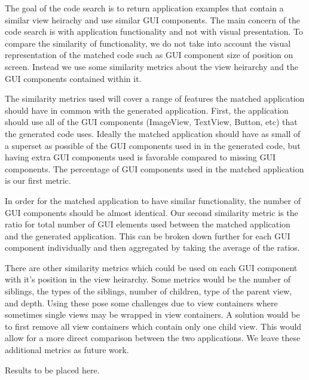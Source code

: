 \documentclass[10pt,twocolumn]{article}
\begin{document}

The goal of the code search is to return application examples that contain a similar view heirachy and use similar GUI components. The main concern of the code search is with application functionality and not with visual presentation. To compare the similarity of functionality, we do not take into account the visual representation of the matched code such as GUI component size of position on screen. Instead we use some similarity metrics about the view heirarchy and the GUI components contained within it.

The similarity metrics used will cover a range of features the matched application should have in common with the generated application. First, the application should use all of the GUI components (ImageView, TextView, Button, etc) that the generated code uses. Ideally the matched application should have as small of a superset as possible of the GUI components used in in the generated code, but having extra GUI components used is favorable compared to missing GUI components. The percentage of GUI components used in the matched application is our first metric.

In order for the matched application to have similar functionality, the number of GUI components should be almost identical. Our second similarity metric is the ratio for total number of GUI elements used between the matched application and the generated application. This can be broken down further for each GUI component individually and then aggregated by taking the average of the ratios.

There are other similarity metrics which could be used on each GUI component with it's position in the view heirarchy. Some metrics would be the number of siblings, the types of the siblings, number of children, type of the parent view, and depth. Using these pose some challenges due to view containers where sometimes single views may be wrapped in view containers. A solution would be to first remove all view containers which contain only one child view. This would allow for a more direct comparison between the two applications. We leave these additional metrics as future work.

Results to be placed here.


\end{document}
